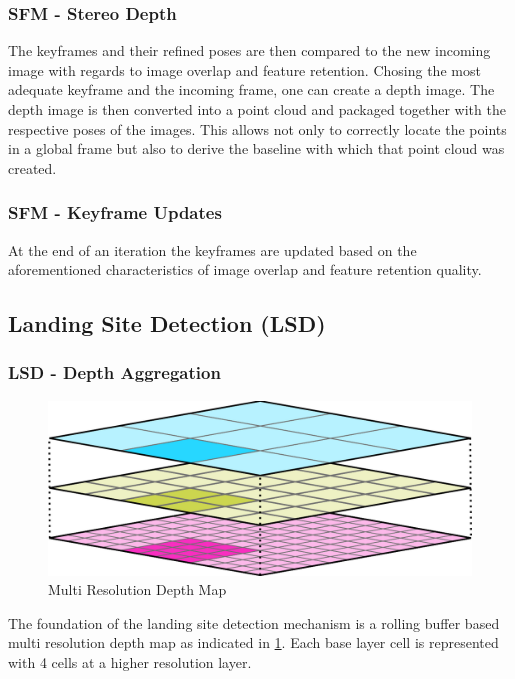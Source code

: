 \subsubsection{SFM - Stereo Depth}

The keyframes and their refined poses are then compared to the new incoming image with regards to image overlap and feature retention. Chosing the most adequate keyframe and the incoming frame, one can create a depth image. The depth image is then converted into a point cloud and packaged together with the respective poses of the images. This allows not only to correctly locate the points in a global frame but also to derive the baseline with which that point cloud was created.

\subsubsection{SFM - Keyframe Updates}

At the end of an iteration the keyframes are updated based on the aforementioned characteristics of image overlap and feature retention quality.

\subsection{Landing Site Detection (LSD)}\label{subsec:setup:LSD}

\subsubsection{LSD - Depth Aggregation}\label{subsubsec:setup:aggregation}

\begin{figure}[ht!]
    \centering
    \includegraphics[scale=0.25]{images/setup/DEM.png}
    \caption{Multi Resolution Depth Map}
    \label{fig:DEM}
\end{figure}

The foundation of the landing site detection mechanism is a rolling buffer based multi resolution depth map as indicated in \cref{fig:DEM}. Each base layer cell is represented with 4 cells at a higher resolution layer.

